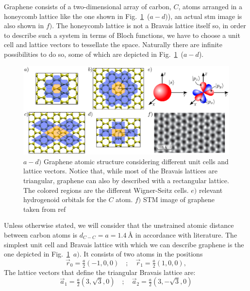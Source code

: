 Graphene consists of a two-dimensional array of carbon, $C$, atoms arranged in a honeycomb lattice like the one shown in Fig.~\ref{graphene_structure}~($a-d)$)\cite{Huang2011}, an actual \ac{stm} image is also shown in $f)$. The honeycomb lattice is not a Bravais lattice itself so, in order to describe such a system in terms of Bloch functions, we have to choose a unit cell and lattice vectors to tessellate the space. Naturally there are infinite possibilities to do so, some of which are depicted in Fig.~\ref{graphene_structure}~($a-d$).
\begin{figure}[h!]
\centering
\includegraphics[width=\textwidth]{chapter04/figures/graphene.pdf}
\vspace{-7pt}
\caption{$a-d)$ Graphene atomic structure considering different unit cells and lattice vectors. Notice that, while most of the Bravais lattices are triangular, graphene can also by described with a rectangular lattice. The colored regions are the different Wigner-Seitz cells. $e)$ relevant hydrogenoid orbitals for the $C$ atom. $f)$ STM image of graphene taken from ref~\cite{Huang2011}}
\label{graphene_structure}
\end{figure}
\FloatBarrier
Unless otherwise stated, we will consider that the unstrained atomic distance between carbon atoms is $d_{C-C}=a=\SI{1.4}{\angstrom}$ in accordance with literature\cite{KatsnelsonBook, Cooper2012, Ishigami2007}. %
The simplest unit cell and  Bravais lattice with which we can describe graphene is the one depicted in Fig.~\ref{graphene_structure}~$a)$. It consists of two atoms in the positions
\begin{equation}
\vec{r}_0 = \tfrac{a}{2}(-1,0,0) \quad;\quad
\vec{r}_1 = \tfrac{a}{2}(1,0,0),
\label{at_pos}
\end{equation}
The lattice vectors that define the triangular Bravais lattice are:
\begin{equation}
\vec{a}_1 = \tfrac{a}{2}\left(3,\sqrt{3},0\right) \quad;\quad
\vec{a}_2 = \tfrac{a}{2}\left(3,-\sqrt{3},0\right)
\label{latt_vec}
\end{equation}

